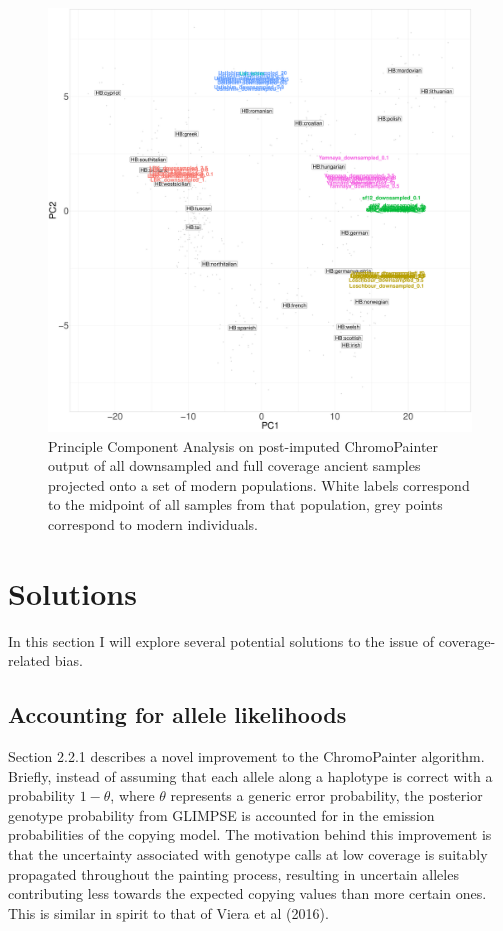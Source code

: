\begin{figure}[htp]
    \centering
    \includegraphics[width=1.0\textwidth]{../images/chapter1/CP_unlinked_PCA.pdf}
    \caption{Principle Component Analysis on post-imputed ChromoPainter output of all downsampled and full coverage ancient samples projected onto a set of modern populations. White labels correspond to the midpoint of all samples from that population, grey points correspond to modern individuals.}
    \label{fig:CP_unlinked_PCA}
\end{figure}





\section{Solutions}

In this section I will explore several potential solutions to the issue of coverage-related bias.

\subsection{Accounting for allele likelihoods}

Section 2.2.1 describes a novel improvement to the ChromoPainter algorithm. Briefly, instead of assuming that each allele along a haplotype is correct with a probability $1-\theta$, where $\theta$ represents a generic error probability, the posterior genotype probability from GLIMPSE is accounted for in the emission probabilities of the copying model. The motivation behind this improvement is that the uncertainty associated with genotype calls at low coverage is suitably propagated throughout the painting process, resulting in uncertain alleles contributing less towards the expected copying values than more certain ones. This is similar in spirit to that of Viera et al (2016). 

